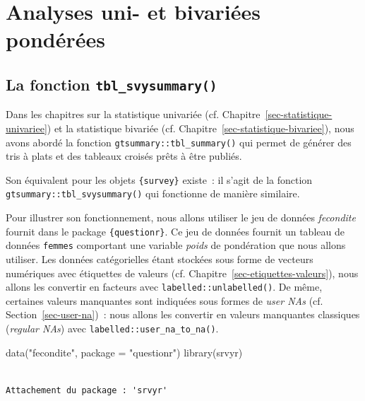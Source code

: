 \documentclass[
  letterpaper,
  DIV=11,
  numbers=noendperiod,
  oneside]{scrreprt}
\newenvironment{Shaded}{\begin{snugshade}}{\end{snugshade}}
\newcommand{\AttributeTok}[1]{\textcolor[rgb]{0.40,0.45,0.13}{#1}}
\newcommand{\FunctionTok}[1]{\textcolor[rgb]{0.28,0.35,0.67}{#1}}
\newcommand{\NormalTok}[1]{\textcolor[rgb]{0.00,0.23,0.31}{#1}}
\newcommand{\StringTok}[1]{\textcolor[rgb]{0.13,0.47,0.30}{#1}}
\begin{document}
\hypertarget{sec-analyses-bivariees-ponderees}{%
\chapter{Analyses uni- et bivariées
pondérées}\label{sec-analyses-bivariees-ponderees}}

\hypertarget{la-fonction-tbl_svysummary}{%
\section{\texorpdfstring{La fonction
\texttt{tbl\_svysummary()}}{La fonction tbl\_svysummary()}}\label{la-fonction-tbl_svysummary}}

Dans les chapitres sur la statistique univariée (cf.
Chapitre~\ref{sec-statistique-univariee}) et la statistique bivariée
(cf. Chapitre~\ref{sec-statistique-bivariee}), nous avons abordé la
fonction \texttt{gtsummary::tbl\_summary()} qui permet de générer des
tris à plats et des tableaux croisés prêts à être publiés.

Son équivalent pour les objets \texttt{\{survey\}} existe~: il s'agit de
la fonction \texttt{gtsummary::tbl\_svysummary()} qui fonctionne de
manière similaire.

Pour illustrer son fonctionnement, nous allons utiliser le jeu de
données \emph{fecondite} fournit dans le package \texttt{\{questionr\}}.
Ce jeu de données fournit un tableau de données \texttt{femmes}
comportant une variable \emph{poids} de pondération que nous allons
utiliser. Les données catégorielles étant stockées sous forme de
vecteurs numériques avec étiquettes de valeurs (cf.
Chapitre~\ref{sec-etiquettes-valeurs}), nous allons les convertir en
facteurs avec \texttt{labelled::unlabelled()}. De même, certaines
valeurs manquantes sont indiquées sous formes de \emph{user NAs} (cf.
Section~\ref{sec-user-na})~: nous allons les convertir en valeurs
manquantes classiques (\emph{regular NAs}) avec
\texttt{labelled::user\_na\_to\_na()}.

\begin{Shaded}
\begin{Highlighting}[]
\FunctionTok{data}\NormalTok{(}\StringTok{"fecondite"}\NormalTok{, }\AttributeTok{package =} \StringTok{"questionr"}\NormalTok{)}
\FunctionTok{library}\NormalTok{(srvyr)}
\end{Highlighting}
\end{Shaded}

\begin{verbatim}

Attachement du package : 'srvyr'
\end{verbatim}
\end{document}
